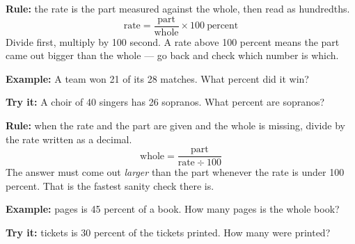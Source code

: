 \documentclass[12pt]{article}
\begin{document}


\begin{formulabox}
\textbf{Rule:} the rate is the part measured against the whole, then read as
hundredths.
\[
  \text{rate} = \frac{\text{part}}{\text{whole}} \times 100 \ \text{percent}
\]
Divide first, multiply by 100 second. A rate above 100 percent means the part
came out bigger than the whole --- go back and check which number is which.
\end{formulabox}

\begin{examplebox}
\textbf{Example:} \quad A team won 21 of its 28 matches. What percent did it
win?
\end{examplebox}

\begin{tryitbox}
\textbf{Try it:} \quad A choir of 40 singers has 26 sopranos. What percent are
sopranos?\\[2pt]
\end{tryitbox}


\begin{formulabox}
\textbf{Rule:} when the rate and the part are given and the whole is missing,
divide by the rate written as a decimal.
\[
  \text{whole} = \frac{\text{part}}{\text{rate} \div 100}
\]
The answer must come out \emph{larger} than the part whenever the rate is under
100 percent. That is the fastest sanity check there is.
\end{formulabox}

\begin{examplebox}
\textbf{Example:}  pages is 45 percent of a book. How many pages is the
whole book?
\end{examplebox}

\begin{tryitbox}
\textbf{Try it:}  tickets is 30 percent of the tickets printed. How many
were printed?\\[2pt]
\end{tryitbox}
\end{document}

